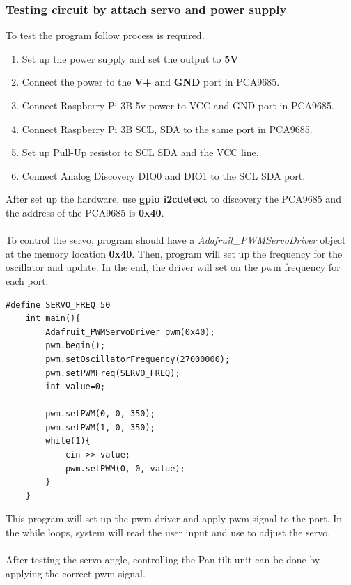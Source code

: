 \documentclass{article}
\begin{document}
\subsubsection{Testing circuit by attach servo and power supply}
To test the program follow process is required.
\begin{enumerate}[1)]
	\item Set up the power supply and set the output to \textbf{5V}
	\item Connect the power to the \textbf{V+} and \textbf{GND} port in PCA9685.
	\item Connect Raspberry Pi 3B 5v power to VCC and GND port in PCA9685.
	\item Connect Raspberry Pi 3B SCL, SDA to the same port in PCA9685.
	\item Set up Pull-Up resistor to SCL SDA and the VCC line.
	\item Connect Analog Discovery DIO0 and DIO1 to the SCL SDA port.
\end{enumerate}
After set up the hardware, use \textbf{gpio i2cdetect} to discovery the PCA9685 and the address of the PCA9685 is \textbf{0x40}.\\\\
To control the servo, program should have a \textit{Adafruit\_PWMServoDriver} object at the memory location \textbf{0x40}. Then, program will set up the frequency for the oscillator and update. In the end, the driver will set on the pwm frequency for each port.
\begin{lstlisting}
#define SERVO_FREQ 50
	int main(){
		Adafruit_PWMServoDriver pwm(0x40);
		pwm.begin();
		pwm.setOscillatorFrequency(27000000);
		pwm.setPWMFreq(SERVO_FREQ);
		int value=0;
		
		pwm.setPWM(0, 0, 350);
		pwm.setPWM(1, 0, 350);
		while(1){
			cin >> value;
			pwm.setPWM(0, 0, value);
		}
	}
\end{lstlisting}
This program will set up the pwm driver and apply pwm signal to the port. In the while loops, system will read the user input and use to adjust the servo.
\\\\
After testing the servo angle, controlling the Pan-tilt unit can be done by applying the correct pwm signal.
\end{document}
